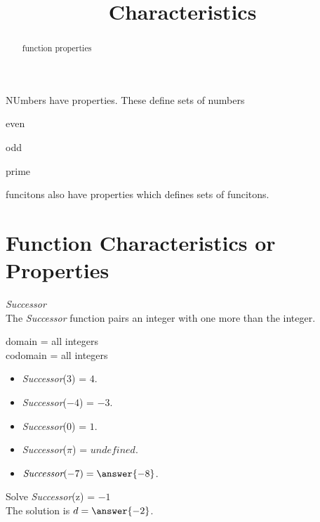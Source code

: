 \documentclass{ximera}
\title{Characteristics}
\begin{document}
\begin{abstract}
function properties
\end{abstract}
\maketitle





NUmbers have properties.  These define sets of numbers

even

odd

prime

funcitons also have properties which defines sets of funcitons.







\section{Function Characteristics or Properties}




\begin{question} \textit{Successor} \\
The \textit{Successor} function pairs an integer with one more than the integer.

domain = all integers  \\ 
codomain = all integers


\begin{itemize}
\item \textit{Successor}($3$) = $4$.
\item \textit{Successor}($-4$) = $-3$.
\item \textit{Successor}($0$) = $1$.
\item \textit{Successor}($\pi$) = $undefined$.

\item $\textit{Successor}(-7) = \answer{-8}$.
\end{itemize}


Solve \textit{Successor}(z) = $-1$ \\

The solution is $d = \answer{-2}$.

\end{question} 
\end{document}
